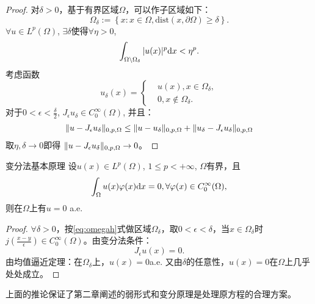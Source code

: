 \begin{proof}
    对$\delta>0$，基于有界区域$\Omega$，可以作子区域如下：
    \begin{equation}
        \label{eq:omegah}
        \Omega_{\delta}:=\left\{x:x\in\Omega,\text{dist}(x,\partial\Omega)\ge\delta\right\}.
    \end{equation}
    $\forall u\in L^{p}(\Omega)$, $\exists\delta$使得$\forall\eta>0$, 
    \begin{equation}
        \int_{\Omega\setminus\Omega_{\delta}}|u(x)|^{p}\mathrm{d} x<\eta^{p}.
    \end{equation}
    考虑函数
    \begin{equation}
        u_{\delta}(x)=\left\{
            \begin{aligned}
                &u(x),x\in\Omega_{\delta},\\
                &0,x\notin\Omega_{\delta}.
            \end{aligned}
        \right.
    \end{equation}
    对于$0<\epsilon<\frac{\delta}{2}$, $J_{\epsilon}u_{\delta}\in C_{0}^{\infty}(\Omega)$, 并且：
    \begin{equation}
        \begin{aligned}
            \|u-J_{\epsilon}u_{\delta}\|_{0,p,\Omega}\le\|u-u_{\delta}\|_{0,p,\Omega}+\|u_{\delta}-J_{\epsilon}u_{\delta}\|_{0,p,\Omega}
        \end{aligned}
    \end{equation}
    取$\eta,\delta\rightarrow 0$即得 $\|u-J_{\epsilon}u_{\delta}\|_{0,p,\Omega}\rightarrow 0$。
\end{proof}
\begin{corollary}{变分法基本原理}
    设$u(x)\in L^{p}(\Omega)$, $1\le p<+\infty$, $\Omega$有界，且
    \begin{equation}
        \int_{\Omega}u(x)\varphi(x)\mathrm{d} x=0,\forall\varphi(x)\in C_{0}^{\infty}(\Omega),
    \end{equation}
    则在$\Omega$上有$u=0$ a.e.
\end{corollary}
\begin{proof}
    $\forall\delta>0$，按\eqref{eq:omegah}式做区域$\Omega_{\delta}$，取$0<\epsilon<\delta$，当$x\in\Omega_{\delta}$时$j(\frac{x-y}{\epsilon})\in C_{0}^{\infty}(\Omega)$。由变分法条件：
    \begin{equation}
        J_{\epsilon}u(x)=0.
    \end{equation}
    由均值逼近定理：在$\Omega_{\delta}$上，$u(x)=0$a.e. 又由$\delta$的任意性，$u(x)=0$在$\Omega$上几乎处处成立。
\end{proof}
\begin{remark}
    上面的推论保证了第二章阐述的弱形式和变分原理是处理原方程的合理方案。
\end{remark}
